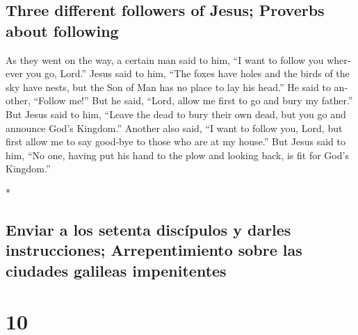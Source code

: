 \begin{paracol}{2}
\begin{otherlanguage}{english}
\hypertarget{three-different-followers-of-jesus-proverbs-about-following}{%
\subsection{Three different followers of Jesus; Proverbs about
following}\label{three-different-followers-of-jesus-proverbs-about-following}}

 As they went on the way, a certain man said to him, ``I
want to follow you wherever you go, Lord.''  Jesus said
to him, ``The foxes have holes and the birds of the sky have nests, but
the Son of Man has no place to lay his head.''  He said
to another, ``Follow me!'' But he said, ``Lord, allow me first to go and
bury my father.''  But Jesus said to him, ``Leave the
dead to bury their own dead, but you go and announce God's Kingdom.''
 Another also said, ``I want to follow you, Lord, but
first allow me to say good-bye to those who are at my house.''
 But Jesus said to him, ``No one, having put his hand to
the plow and looking back, is fit for God's Kingdom.''

\end{otherlanguage}

\switchcolumn[0]*

\hypertarget{enviar-a-los-setenta-discuxedpulos-y-darles-instrucciones-arrepentimiento-sobre-las-ciudades-galileas-impenitentes}{%
\subsection{Enviar a los setenta discípulos y darles instrucciones;
Arrepentimiento sobre las ciudades galileas
impenitentes}\label{enviar-a-los-setenta-discuxedpulos-y-darles-instrucciones-arrepentimiento-sobre-las-ciudades-galileas-impenitentes}}

\hypertarget{section-18}{%
\section{10}\label{section-18}}


\end{paracol}

